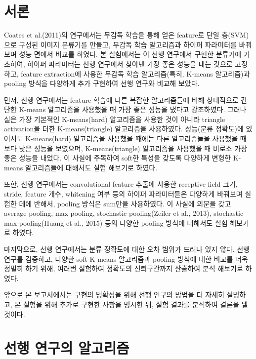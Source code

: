 \documentclass[a4paper,9pt]{article}
\begin{document}
\begin{multicols*}{2}

\section{서론}

Coates et al.(2011)의 연구에서는 무감독 학습을 통해 얻은 feature로 단일 층(SVM)으로 구성된 이미지 분류기를 만들고, 무감독 학습 알고리즘과 하이퍼 파라미터를 바꿔보며 성능 면에서 비교를 하였다.
본 실험에서는 이 선행 연구에서 구현한 분류기에 기초하여, 하이퍼 파라미터는 선행 연구에서 찾아낸 가장 좋은 성능을 내는 것으로 고정하고, feature extraction에 사용한 무감독 학습 알고리즘(특히, K-means 알고리즘)과 pooling 방식을 다양하게 추가 구현하여 선행 연구와 비교해 보았다.

먼저, 선행 연구에서는 feature 학습에 다른 복잡한 알고리즘들에 비해 상대적으로 간단한 K-means 알고리즘을 사용했을 때 가장 좋은 성능을 냈다고 강조하였다.
그러나 실은 가장 기본적인 K-means(hard) 알고리즘을 사용한 것이 아니라 triangle activation을 더한 K-means(triangle) 알고리즘을 사용하였다.
성능(분류 정확도)에 있어서도 K-means(hard) 알고리즘을 사용했을 때에는 다른 알고리즘들을 사용했을 때 보다 낮은 성능을 보였으며, K-means(triangle) 알고리즘을 사용했을 때 비로소 가장 좋은 성능을 내었다.
이 사실에 주목하여 soft한 특성을 갖도록 다양하게 변형한 K-means 알고리즘들에 대해서도 실험 해보기로 하였다.

또한, 선행 연구에서는 convolutional feature 추출에 사용한 receptive field 크기, stride, feature 개수, whitening 여부 등의 하이퍼 파라미터들은 다양하게 바꿔보며 실험한 데에 반해서, pooling 방식은 sum만을 사용하였다.
이 사실에 의문을 갖고 average pooling, max pooling, stochastic pooling(Zeiler et al., 2013), stochastic max-pooling(Huang et al., 2015) 등의 다양한 pooling 방식에 대해서도 실험 해보기로 하였다.

마지막으로, 선행 연구에서는 분류 정확도에 대한 오차 범위가 드러나 있지 않다.
선행 연구를 검증하고, 다양한 soft K-means 알고리즘과 pooling 방식에 대한 비교를 더욱 정밀히 하기 위해, 여러번 실험하여 정확도의 신뢰구간까지 산출하여 분석 해보기로 하였다.

앞으로 본 보고서에서는 구현의 명확성을 위해 선행 연구의 방법을 더 자세히 설명하고, 본 실험을 위해 추가로 구현한 사항을 명시한 뒤, 실험 결과를 분석하여 결론을 낼 것이다.

\section{선행 연구의 알고리즘}


\end{multicols*}
\end{document}
